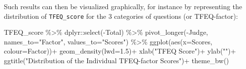\documentclass[
]{book}
\newenvironment{Shaded}{\begin{snugshade}}{\end{snugshade}}
\newcommand{\AttributeTok}[1]{\textcolor[rgb]{0.77,0.63,0.00}{#1}}
\newcommand{\ConstantTok}[1]{\textcolor[rgb]{0.00,0.00,0.00}{#1}}
\newcommand{\FloatTok}[1]{\textcolor[rgb]{0.00,0.00,0.81}{#1}}
\newcommand{\FunctionTok}[1]{\textcolor[rgb]{0.00,0.00,0.00}{#1}}
\newcommand{\NormalTok}[1]{#1}
\newcommand{\OtherTok}[1]{\textcolor[rgb]{0.56,0.35,0.01}{#1}}
\newcommand{\SpecialCharTok}[1]{\textcolor[rgb]{0.00,0.00,0.00}{#1}}
\newcommand{\StringTok}[1]{\textcolor[rgb]{0.31,0.60,0.02}{#1}}
\begin{document}
\begin{Shaded}
\end{Shaded}

Such results can then be visualized graphically, for instance by representing the distribution of \texttt{TFEQ\_score} for the 3 categories of questions (or TFEQ-factor):

\begin{Shaded}
\begin{Highlighting}[]
\NormalTok{TFEQ\_score }\SpecialCharTok{\%\textgreater{}\%} 
\NormalTok{  dplyr}\SpecialCharTok{::}\FunctionTok{select}\NormalTok{(}\SpecialCharTok{{-}}\NormalTok{Total) }\SpecialCharTok{\%\textgreater{}\%} 
  \FunctionTok{pivot\_longer}\NormalTok{(}\SpecialCharTok{{-}}\NormalTok{Judge, }\AttributeTok{names\_to=}\StringTok{"Factor"}\NormalTok{, }\AttributeTok{values\_to=}\StringTok{"Scores"}\NormalTok{) }\SpecialCharTok{\%\textgreater{}\%} 
  \FunctionTok{ggplot}\NormalTok{(}\FunctionTok{aes}\NormalTok{(}\AttributeTok{x=}\NormalTok{Scores, }\AttributeTok{colour=}\NormalTok{Factor))}\SpecialCharTok{+}
  \FunctionTok{geom\_density}\NormalTok{(}\AttributeTok{lwd=}\FloatTok{1.5}\NormalTok{)}\SpecialCharTok{+}
  \FunctionTok{xlab}\NormalTok{(}\StringTok{"TFEQ Score"}\NormalTok{)}\SpecialCharTok{+}
  \FunctionTok{ylab}\NormalTok{(}\StringTok{""}\NormalTok{)}\SpecialCharTok{+}
  \FunctionTok{ggtitle}\NormalTok{(}\StringTok{"Distribution of the Individual TFEQ{-}factor Scores"}\NormalTok{)}\SpecialCharTok{+}
  \FunctionTok{theme\_bw}\NormalTok{()}
\end{Highlighting}
\end{Shaded}
\end{document}

